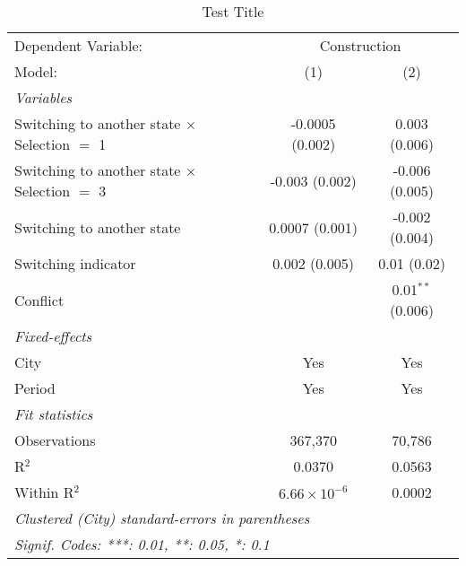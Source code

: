 \begin{table}[htbp]
   \caption{\label{tab:baseline_1y} Test Title}
   \centering
   \begin{tabular}{lcc}
      \tabularnewline \midrule \midrule
      Dependent Variable: & \multicolumn{2}{c}{Construction}\\
      Model:                                               & (1)                   & (2)\\  
      \midrule
      \emph{Variables}\\
      Switching to another state $\times$ Selection $=$ 1  & -0.0005 (0.002)       & 0.003 (0.006)\\   
      Switching to another state $\times$ Selection $=$ 3  & -0.003 (0.002)        & -0.006 (0.005)\\   
      Switching to another state                           & 0.0007 (0.001)        & -0.002 (0.004)\\   
      Switching indicator                                  & 0.002 (0.005)         & 0.01 (0.02)\\   
      Conflict                                             &                       & 0.01$^{**}$ (0.006)\\   
      \midrule
      \emph{Fixed-effects}\\
      City                                                 & Yes                   & Yes\\  
      Period                                               & Yes                   & Yes\\  
      \midrule
      \emph{Fit statistics}\\
      Observations                                         & 367,370               & 70,786\\  
      R$^2$                                                & 0.0370                & 0.0563\\  
      Within R$^2$                                         & $6.66\times 10^{-6}$  & 0.0002\\  
      \midrule \midrule
      \multicolumn{3}{l}{\emph{Clustered (City) standard-errors in parentheses}}\\
      \multicolumn{3}{l}{\emph{Signif. Codes: ***: 0.01, **: 0.05, *: 0.1}}\\
   \end{tabular}
\end{table}
